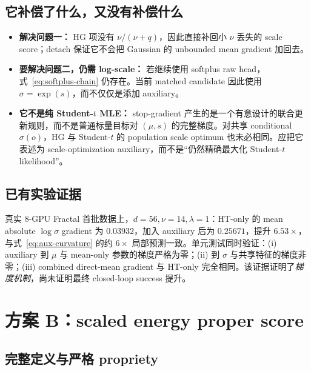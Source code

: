 \documentclass[10pt]{article}
\begin{document}
\subsection{它补偿了什么，又没有补偿什么}

\begin{itemize}
 \item \textbf{解决问题一：} HG 项没有 $\nu/(\nu+q)$，因此直接补回小 $\nu$ 丢失的 scale score；detach 保证它不会把 Gaussian 的 unbounded mean gradient 加回去。
 \item \textbf{要解决问题二，仍需 log-scale：} 若继续使用 softplus raw head，式~\eqref{eq:softplus-chain} 仍存在。当前 matched candidate 因此使用 $\sigma=\exp(s)$，而不仅仅是添加 auxiliary。
 \item \textbf{它不是纯 Student-$t$ MLE：} stop-gradient 产生的是一个有意设计的联合更新规则，而不是普通标量目标对 $(\mu,s)$ 的完整梯度。对共享 conditional $\sigma(o)$，HG 与 Student-$t$ 的 population scale optimum 也未必相同。应把它表述为 scale-optimization auxiliary，而不是“仍然精确最大化 Student-$t$ likelihood”。
\end{itemize}

\subsection{已有实验证据}

真实 8-GPU Fractal 首批数据上，$d=56,\nu=14,\lambda=1$：HT-only 的 mean absolute $\log\sigma$ gradient 为 $0.03932$，加入 auxiliary 后为 $0.25671$，提升 $6.53\times$，与式~\eqref{eq:aux-curvature} 的约 $6\times$ 局部预测一致。单元测试同时验证：(i) auxiliary 到 $\mu$ 与 mean-only 参数的梯度严格为零；(ii) 到 $\sigma$ 与共享特征的梯度非零；(iii) combined direct-mean gradient 与 HT-only 完全相同。该证据证明了\emph{梯度机制}，尚未证明最终 closed-loop success 提升。

\section{方案 B：scaled energy proper score}

\subsection{完整定义与严格 propriety}
\end{document}
